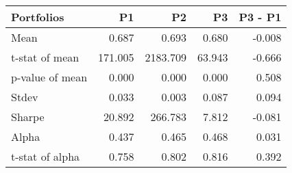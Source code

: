 \begin{tabular}{lrrrr}
\toprule
Portfolios & P1 & P2 & P3 & P3 - P1 \\
\midrule
Mean & 0.687 & 0.693 & 0.680 & -0.008 \\
t-stat of mean & 171.005 & 2183.709 & 63.943 & -0.666 \\
p-value of mean & 0.000 & 0.000 & 0.000 & 0.508 \\
Stdev & 0.033 & 0.003 & 0.087 & 0.094 \\
Sharpe & 20.892 & 266.783 & 7.812 & -0.081 \\
Alpha & 0.437 & 0.465 & 0.468 & 0.031 \\
t-stat of alpha & 0.758 & 0.802 & 0.816 & 0.392 \\
\bottomrule
\end{tabular}
